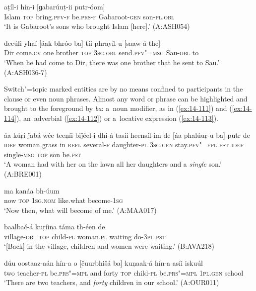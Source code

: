 \begin{exe}
\ex
\label{ex:14-109}
\gll [islaám ba] aṭíl-i hín-i [ɡabarúuṭ-ii putr-óom] \\
Islam \textsc{top} bring.\textsc{pfv-f} be.\textsc{prs-f} Gabaroot-\textsc{gen} son-\textsc{pl.obl } \\
\glt `It is Gabaroot's sons who brought Islam [here].' (A:ASH054)

\ex
\label{ex:14-110}
\gll deeúli yhaí [áak bhróo ba] tíi phrayíl-u  [saaw-á the]  \\
Dir come.\textsc{cv} one brother \textsc{top} \textsc{3sg.obl} send.\textsc{pfv"=msg}  Sau-\textsc{obl} to \\
\glt `When he had come to Dir, there was one brother that he sent to Sau.' (A:ASH036-7)
\end{exe}

Switch"=topic marked entities are by no means confined to participants in the clause or even noun phrases. Almost any word or phrase can be highlighted and brought to the foreground by \textit{ba}: a~noun modifier, as in (\ref{ex:14-111}) and (\ref{ex:14-114}), an~adverbial (\ref{ex:14-112}) or a~locative expression (\ref{ex:14-113}). 

\begin{exe}
\ex
\label{ex:14-111}
\gll áa kúṛi ǰabá wée teeṇíi biǰéel-i dhi-á  tasíi heensíl-im de
\textsc{[}áa phalúuṛ-u ba]  putr de \\
\textsc{idef} woman grass in \textsc{refl} several-\textsc{f } daughter-\textsc{pl}  \textsc{3sg.gen} stay.\textsc{pfv"=fpl} \textsc{pst} \textsc{idef} single-\textsc{msg} \textsc{top} son be.\textsc{pst} \\
\glt `A woman had with her on the lawn all her daughters and a \textit{single} son.' (A:BRE001)

\ex
\label{ex:14-112}
\gll [típa ba] ma kanáa bh-úum \\
now \textsc{top} \textsc{1sg.nom} like.what become-\textsc{1sg } \\
\glt `Now then, what will become of me.' (A:MAA017)

\ex
\label{ex:14-113}
\gll [díiš-a ba] baalbač-á kuṛíina táma  th-éen de \\
village-\textsc{obl} \textsc{top} child-\textsc{pl} woman.\textsc{pl} waiting do-\textsc{3pl} \textsc{pst } \\
\glt `[Back] in the village, children and women were waiting.' (B:AVA218)

\ex
\label{ex:14-114}
\gll dúu oostaaz-aán hín-a o [čuurbhišá  ba] kuṇaak-á hín-a asíi iskuúl \\
two teacher-\textsc{pl} be.\textsc{prs"=mpl} and forty  \textsc{top} child-\textsc{pl} be.\textsc{prs"=mpl} \textsc{1pl.gen} school  \\
\glt `There are two teachers, and \textit{forty} children in our school.' (A:OUR011)
\end{exe}

